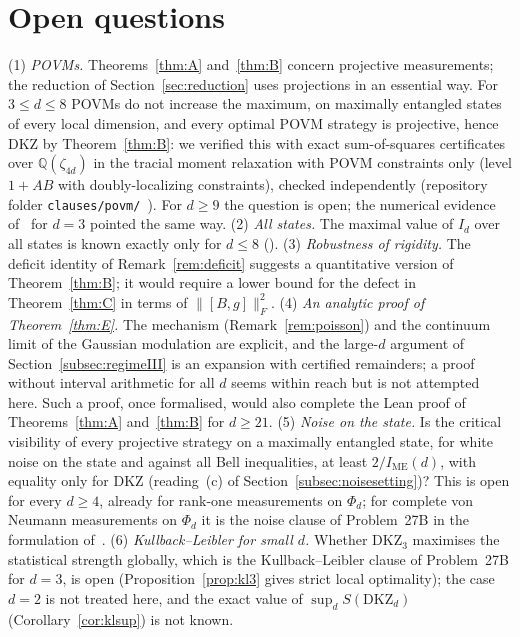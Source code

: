 \documentclass[11pt]{amsart}
\theoremstyle{definition}
\theoremstyle{remark}
\numberwithin{equation}{section}
\newcommand{\IME}{I_{\mathrm{ME}}}
\newcommand{\DKZ}{\mathrm{DKZ}}
\begin{document}
\section{Open questions}\label{sec:open}

(1) \emph{POVMs.} Theorems~\ref{thm:A} and~\ref{thm:B} concern projective measurements; the reduction of
Section~\ref{sec:reduction} uses projections in an essential way. For $3\le d\le8$ POVMs do not increase the maximum,
on maximally entangled states of every local dimension, and every optimal POVM strategy is projective, hence DKZ by
Theorem~\ref{thm:B}: we verified this with exact sum-of-squares certificates over $\mathbb Q(\zeta_{4d})$ in the tracial
moment relaxation with POVM constraints only (level $1{+}AB$ with doubly-localizing constraints), checked
independently (repository folder \texttt{clauses/povm/}~\cite{repo-oqp27}). For $d\ge9$ the question is
open; the numerical evidence of~\cite{LVN} for $d=3$ pointed the same way. (2) \emph{All states.} The maximal value of $I_d$ over all states is
known exactly only for $d\le8$ (\cite{IR,repo-cglmp}). (3) \emph{Robustness of rigidity.} The deficit identity of
Remark~\ref{rem:deficit} suggests a quantitative version of Theorem~\ref{thm:B}; it would require a lower bound for the
defect in Theorem~\ref{thm:C} in terms of $\|[B,g]\|_F^2$. (4) \emph{An analytic proof of Theorem~\ref{thm:E}.} The
mechanism (Remark~\ref{rem:poisson}) and the continuum limit of the Gaussian modulation are explicit, and the large-$d$
argument of Section~\ref{subsec:regimeIII} is an expansion with certified remainders; a proof without interval
arithmetic for all $d$ seems within reach but is not attempted here. Such a proof, once formalised, would also complete
the Lean proof of Theorems~\ref{thm:A} and~\ref{thm:B} for $d\ge21$. (5) \emph{Noise on the state.} Is the critical
visibility of every projective strategy on a maximally entangled state, for white noise on the state and against all
Bell inequalities, at least $2/\IME(d)$, with equality only for DKZ (reading~(c) of Section~\ref{subsec:noisesetting})?
This is open for every $d\ge4$, already for rank-one measurements on $\Phi_d$; for complete von Neumann measurements on
$\Phi_d$ it is the noise clause of Problem~27B in the formulation of~\cite{FC3444}. (6) \emph{Kullback--Leibler for
small $d$.} Whether $\DKZ_3$ maximises the statistical strength globally, which is the Kullback--Leibler clause of
Problem~27B for $d=3$, is open (Proposition~\ref{prop:kl3} gives strict local optimality); the case $d=2$ is not treated here, and the exact value of $\sup_dS(\DKZ_d)$
(Corollary~\ref{cor:klsup}) is not known.
\end{document}
